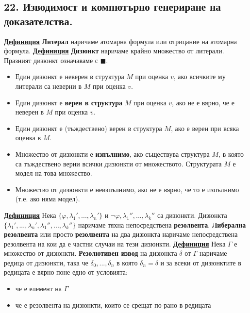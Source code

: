 \documentclass{article}
\begin{document}
\subsection*{\color{bordeaux}22. Изводимост и компютърно генериране на доказателства.}
\textbf{\underline{Дефиниция}}
\textbf{Литерал} наричаме атомарна формула или отрицание на атомарна формула. \newline\newline
\textbf{\underline{Дефиниция}}
\textbf{Дизюнкт} наричаме крайно множество от литерали. Празният дизюнкт означаваме с $\blacksquare$.
\begin{itemize}
    \item Един дизюнкт е неверен в структура $M$ при оценка $v$, ако всичките му литерали са неверни в $M$ при оценка $v$.
    \item Един дизюнкт е \textbf{верен в структура} $M$ при оценка $v$, ако не е вярно, че е неверен в $M$ при оценка $v$.
    \item Един дизюнкт е (тъждествено) верен в структура $M$, ако е верен при всяка оценка в $M$.
    \item Множество от дизюнкти е \textbf{изпълнимо}, ако съществува структура $M$, в която са тъждествено верни всички дизюнкти
    от множеството. Структурата $M$ е модел на това множество.
    \item Множество от дизюнкти е неизпълнимо, ако не е вярно, че то е изпълнимо (т.е. ако няма модел).
\end{itemize}
\textbf{\underline{Дефиниция}}
Нека $\{\varphi, \lambda_1', ..., \lambda_n'\}$ и $\neg\varphi, \lambda_1'', ..., \lambda_k''$ са дизюнкти. 
Дизюнкта $\{\lambda_1', ..., \lambda_n', \lambda_1'', ..., \lambda_k''\}$ наричаме тяхна непосредствена \textbf{резолвента}.
\textbf{Либерална резолвента} или просто \textbf{резолвента} на два дизюнкта наричаме непосредствена резолвента на кои да е частни
случаи на тези дизюнкти. \newline\newline
\textbf{\underline{Дефиниция}}
Нека $\Gamma$ е множество от дизюнкти. \textbf{Резолютивен извод} на дизюнкта $\delta$ от $\Gamma$ наричаме редица от
дизюнкти, така че $\delta_0, ..., \delta_n$ в която $\delta_n = \delta$ и за всеки от дизюнктите в редицата е вярно поне едно от условията:
\begin{itemize}
    \item че е елемент на $\Gamma$
    \item че е резолвента на дизюнкти, които се срещат по-рано в редицата
\end{itemize}
\end{document}
